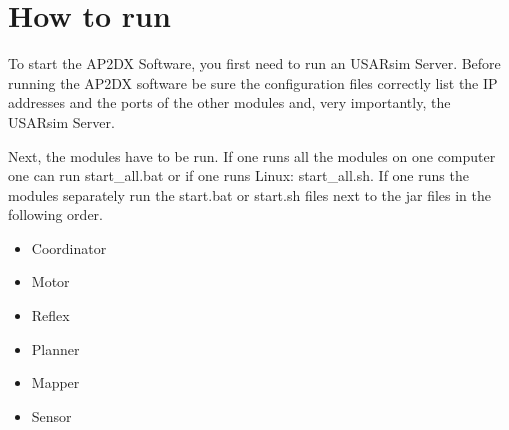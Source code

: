 \documentclass[a4paper, notitlepage]{article}
\begin{document}
\section{How to run}
To start the AP2DX Software, you first need to run an USARsim Server. Before running the AP2DX software be sure the configuration
files correctly list the IP addresses and the ports of the other modules and, very importantly, the USARsim Server. 

Next, the modules have to be run. If one runs all the modules on one computer one can run start\_all.bat or if one runs Linux: start\_all.sh. 
If one runs the modules separately run the start.bat or start.sh files next to the jar files in the following order.
\begin{itemize}
\item Coordinator
\item Motor
\item Reflex
\item Planner
\item Mapper
\item Sensor
\end{itemize}
\end{document}
